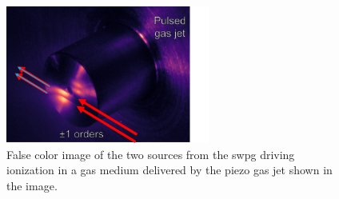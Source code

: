 \begin{figure}
	\centering
	\includegraphics[width=0.6\textwidth]{figures/Two_source/pulse_jet_ts.png}
	\caption{False color image of the two sources from the \gls{swpg} driving ionization in a gas medium delivered by the piezo gas jet shown in the image.}
	\label{fig:piezo_jet}
\end{figure}

